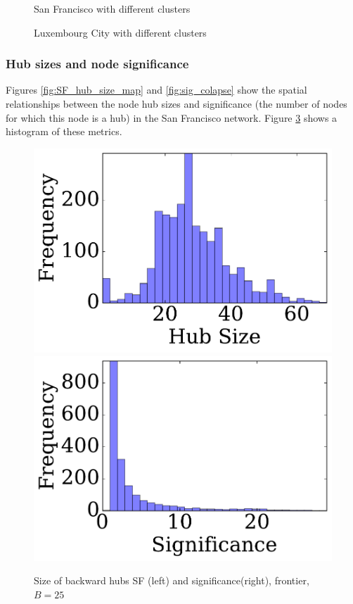 \begin{figure}
\hfill

\caption{San Francisco with different clusters}\label{fig:clusters_sf}
\end{figure}

\begin{figure}
\hfill

\caption{Luxembourg City with different clusters}\label{fig:clusters_lu}
\end{figure}


\subsubsection{Hub sizes and node significance}

Figures \ref{fig:SF_hub_size_map} and \ref{fig:sig_colapse} show the spatial relationships between the node hub sizes and significance (the number of nodes for which this node is a hub) in the San Francisco network. Figure \ref{fig:SF_bwd_size} shows a histogram of these metrics. 

\begin{figure} 
\begin{center}
\includegraphics[clip, trim = 0.1cm 0.3cm 0cm 0cm,scale=0.27]{TexImg/SF_bwd_hub_size.pdf}
\includegraphics[clip, trim = 1.3cm 0.3cm 0cm 0cm,scale=0.27]{TexImg/significance.pdf}
\end{center}
\caption{Size of backward hubs SF (left) and significance(right), frontier, $B=25$}\label{fig:SF_bwd_size}
\end{figure}


